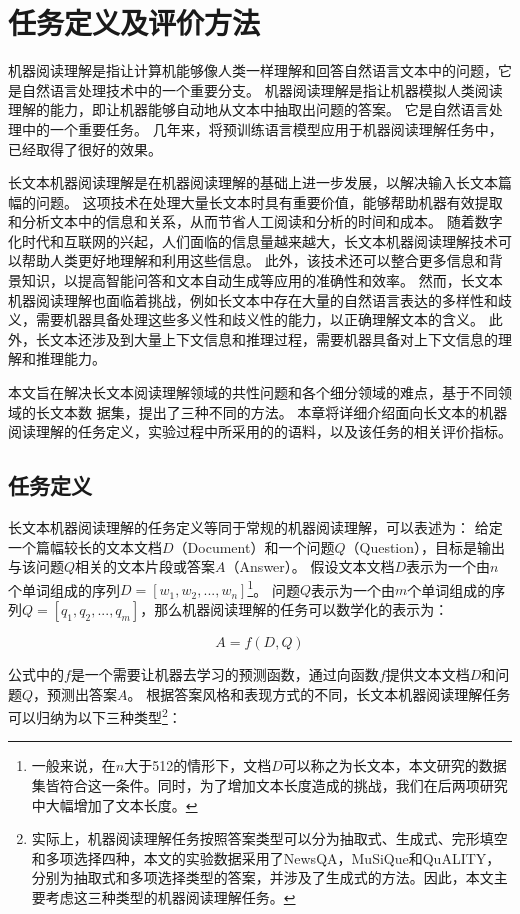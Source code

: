 \chapter{任务定义及评价方法}
机器阅读理解是指让计算机能够像人类一样理解和回答自然语言文本中的问题，它是自然语言处理技术中的一个重要分支。
机器阅读理解是指让机器模拟人类阅读理解的能力，即让机器能够自动地从文本中抽取出问题的答案。
它是自然语言处理中的一个重要任务。
几年来，将预训练语言模型应用于机器阅读理解任务中，已经取得了很好的效果。

长文本机器阅读理解是在机器阅读理解的基础上进一步发展，以解决输入长文本篇幅的问题。
这项技术在处理大量长文本时具有重要价值，能够帮助机器有效提取和分析文本中的信息和关系，从而节省人工阅读和分析的时间和成本。
随着数字化时代和互联网的兴起，人们面临的信息量越来越大，长文本机器阅读理解技术可以帮助人类更好地理解和利用这些信息。
此外，该技术还可以整合更多信息和背景知识，以提高智能问答和文本自动生成等应用的准确性和效率。
然而，长文本机器阅读理解也面临着挑战，例如长文本中存在大量的自然语言表达的多样性和歧义，需要机器具备处理这些多义性和歧义性的能力，以正确理解文本的含义。
此外，长文本还涉及到大量上下文信息和推理过程，需要机器具备对上下文信息的理解和推理能力。

本文旨在解决长文本阅读理解领域的共性问题和各个细分领域的难点，基于不同领域的长文本数
据集，提出了三种不同的方法。
本章将详细介绍面向长文本的机器阅读理解的任务定义，实验过程中所采用的的语料，以及该任务的相关评价指标。

\section{任务定义}
长文本机器阅读理解的任务定义等同于常规的机器阅读理解，可以表述为：
给定一个篇幅较长的文本文档$D$（Document）和一个问题$Q$（Question），目标是输出与该问题$Q$相关的文本片段或答案$A$（Answer）。
假设文本文档$D$表示为一个由$n$个单词组成的序列$D = [w_1, w_2, ..., w_n]$\footnote{一般来说，在$n$大于512的情形下，文档$D$可以称之为长文本，本文研究的数据集皆符合这一条件。同时，为了增加文本长度造成的挑战，我们在后两项研究中大幅增加了文本长度。}。
问题$Q$表示为一个由$m$个单词组成的序列$Q = [q_1, q_2, ..., q_m]$，那么机器阅读理解的任务可以数学化的表示为：

$$A = f(D, Q)$$

公式中的$f$是一个需要让机器去学习的预测函数，通过向函数$f$提供文本文档$D$和问题$Q$，预测出答案$A$。
根据答案风格和表现方式的不同，长文本机器阅读理解任务可以归纳为以下三种类型\footnote{实际上，机器阅读理解任务按照答案类型可以分为抽取式、生成式、完形填空和多项选择四种，本文的实验数据采用了NewsQA，MuSiQue和QuALITY，分别为抽取式和多项选择类型的答案，并涉及了生成式的方法。因此，本文主要考虑这三种类型的机器阅读理解任务。}：

